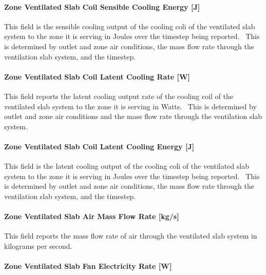 \paragraph{Zone Ventilated Slab Coil Sensible Cooling Energy {[}J{]}}\label{zone-ventilated-slab-coil-sensible-cooling-energy-j}

This field is the sensible cooling output of the cooling coli of the ventilated slab system to the zone it is serving in Joules over the timestep being reported.~ This is determined by outlet and zone air conditions, the mass flow rate through the ventilation slab system, and the timestep.

\paragraph{Zone Ventilated Slab Coil Latent Cooling Rate {[}W{]}}\label{zone-ventilated-slab-coil-latent-cooling-rate-w}

This field reports the latent cooling output rate of the cooling coil of the ventilated slab system to the zone it is serving in Watts.~ This is determined by outlet and zone air conditions and the mass flow rate through the ventilation slab system.

\paragraph{Zone Ventilated Slab Coil Latent Cooling Energy {[}J{]}}\label{zone-ventilated-slab-coil-latent-cooling-energy-j}

This field is the latent cooling output of the cooling coli of the ventilated slab system to the zone it is serving in Joules over the timestep being reported.~ This is determined by outlet and zone air conditions, the mass flow rate through the ventilation slab system, and the timestep.

\paragraph{Zone Ventilated Slab Air Mass Flow Rate {[}kg/s{]}}\label{zone-ventilated-slab-air-mass-flow-rate-kgs}

This field reports the mass flow rate of air through the ventilated slab system in kilograms per second.

\paragraph{Zone Ventilated Slab Fan Electricity Rate {[}W{]}}\label{zone-ventilated-slab-fan-electric-power-w}

